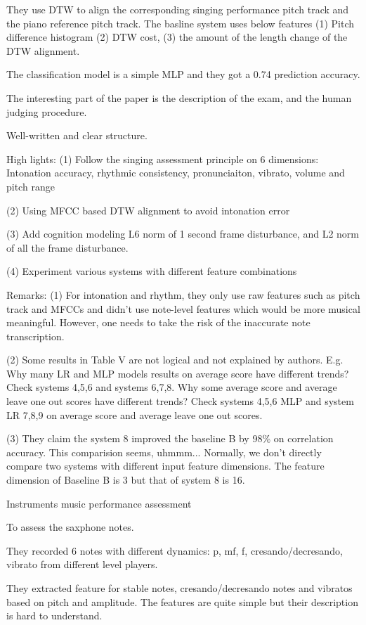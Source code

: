 They use DTW to align the corresponding singing performance pitch track and the piano reference pitch track. The basline system uses below features (1) Pitch difference histogram (2) DTW cost, (3) the amount of the length change of the DTW alignment.

The classification model is a simple MLP and they got a 0.74 prediction accuracy.

The interesting part of the paper is the description of the exam, and the human judging procedure.

 Well-written and clear structure.

High lights:
(1) Follow the singing assessment principle on 6 dimensions:
Intonation accuracy, rhythmic consistency, pronunciaiton, vibrato, volume and pitch range

(2) Using MFCC based DTW alignment to avoid intonation error

(3) Add cognition modeling L6 norm of 1 second frame disturbance, and L2 norm of all the frame disturbance. 

(4) Experiment various systems with different feature combinations

Remarks:
(1) For intonation and rhythm, they only use raw features such as pitch track and MFCCs and didn't use note-level features which would be more musical meaningful. However, one needs to take the risk of the inaccurate note transcription.

(2) Some results in Table V are not logical and not explained by authors. E.g. Why many LR and MLP models results on average score have different trends? Check systems 4,5,6 and systems 6,7,8. Why some average score and average leave one out scores have different trends? Check systems 4,5,6 MLP and system LR 7,8,9 on average score and average leave one out scores.

(3) They claim the system 8 improved the baseline B by 98\% on correlation accuracy. This comparision seems, uhmmm... Normally, we don't directly compare two systems with different input feature dimensions. The feature dimension of Baseline B is 3 but that of system 8 is 16.

Instruments music performance assessment

 To assess the saxphone notes.

They recorded 6 notes with different dynamics: p, mf, f, cresando/decresando, vibrato from different level players.

They extracted feature for stable notes, cresando/decresando notes and vibratos based on pitch and amplitude. The features are quite simple but their description is hard to understand.

